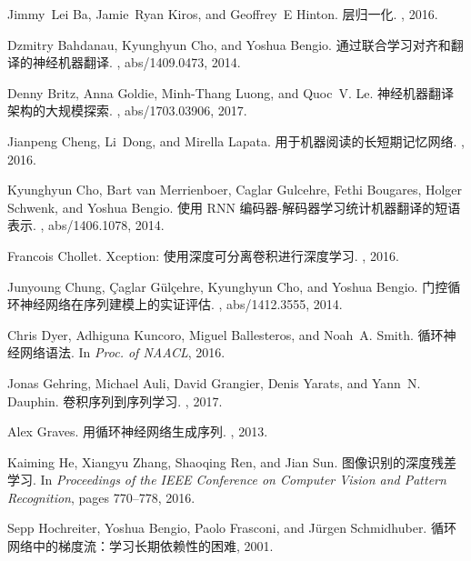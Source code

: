 \documentclass{article}
\begin{document}

%
\begin{thebibliography}{10}

Jimmy~Lei Ba, Jamie~Ryan Kiros, and Geoffrey~E Hinton.
\newblock 层归一化.
, 2016.

Dzmitry Bahdanau, Kyunghyun Cho, and Yoshua Bengio.
\newblock 通过联合学习对齐和翻译的神经机器翻译.
, abs/1409.0473, 2014.

Denny Britz, Anna Goldie, Minh{-}Thang Luong, and Quoc~V. Le.
\newblock 神经机器翻译架构的大规模探索.
, abs/1703.03906, 2017.

Jianpeng Cheng, Li~Dong, and Mirella Lapata.
\newblock 用于机器阅读的长短期记忆网络.
, 2016.

Kyunghyun Cho, Bart van Merrienboer, Caglar Gulcehre, Fethi Bougares, Holger
  Schwenk, and Yoshua Bengio.
\newblock 使用 RNN 编码器-解码器学习统计机器翻译的短语表示.
, abs/1406.1078, 2014.

Francois Chollet.
\newblock Xception: 使用深度可分离卷积进行深度学习.
, 2016.

Junyoung Chung, {\c{C}}aglar G{\"{u}}l{\c{c}}ehre, Kyunghyun Cho, and Yoshua
  Bengio.
\newblock 门控循环神经网络在序列建模上的实证评估.
, abs/1412.3555, 2014.

Chris Dyer, Adhiguna Kuncoro, Miguel Ballesteros, and Noah~A. Smith.
\newblock 循环神经网络语法.
\newblock In {\em Proc. of NAACL}, 2016.

Jonas Gehring, Michael Auli, David Grangier, Denis Yarats, and Yann~N. Dauphin.
\newblock 卷积序列到序列学习.
, 2017.

Alex Graves.
\newblock 用循环神经网络生成序列.
, 2013.

Kaiming He, Xiangyu Zhang, Shaoqing Ren, and Jian Sun.
\newblock 图像识别的深度残差学习.
\newblock In {\em Proceedings of the IEEE Conference on Computer Vision and
  Pattern Recognition}, pages 770--778, 2016.

Sepp Hochreiter, Yoshua Bengio, Paolo Frasconi, and J{\"u}rgen Schmidhuber.
\newblock 循环网络中的梯度流：学习长期依赖性的困难, 2001.


\end{thebibliography}
\end{document}
